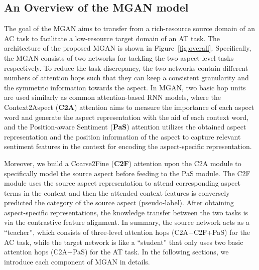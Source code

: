 \documentclass[letterpaper]{article} \usepackage{aaai19}  \usepackage{times}  \usepackage{latexsym}
\begin{document}
\subsection{An Overview of the MGAN model}
The goal of the MGAN aims to transfer from a rich-resource source domain of an AC task to facilitate a low-resource target domain of an AT task. The architecture of the proposed MGAN is shown in Figure~\ref{fig:overall}. Specifically, the MGAN consists of two networks for tackling the two aspect-level tasks respectively. To reduce the task discrepancy, the two networks contain different numbers of attention hops such that they can keep a consistent granularity and the symmetric information towards the aspect. In MGAN, two basic hop units are used similarly as common attention-based RNN models, where the Context2Aspect (\textbf{C2A}) attention aims to measure the importance of each aspect word and generate the aspect representation with the aid of each context word, and the Position-aware Sentiment (\textbf{PaS}) attention utilizes the obtained aspect representation and the position information of the aspect to capture relevant sentiment features in the context for encoding the aspect-specific representation. 

Moreover, we build a Coarse2Fine (\textbf{C2F}) attention upon the C2A module to specifically model the source aspect before feeding to the PaS module. The C2F module uses the source aspect representation to attend corresponding aspect terms in the context and then the attended context features is conversely predicted the category of the source aspect (pseudo-label). After obtaining aspect-specific representations, the knowledge transfer between the two tasks is via the contrastive feature alignment. In summary, the source network acts as a ``teacher'', which consists of three-level attention hops (C2A+C2F+PaS) for the AC task, while the target network is like a ``student'' that only uses two basic attention hops (C2A+PaS) for the AT task. In the following sections, we introduce each component of MGAN in details.
\end{document}
